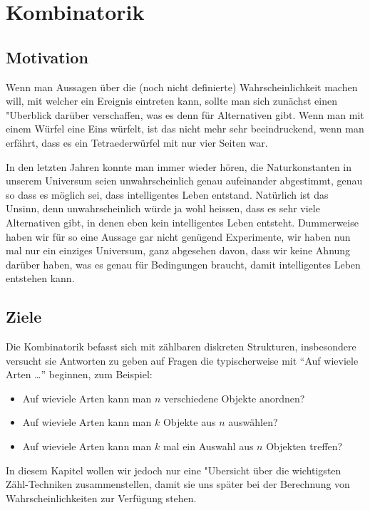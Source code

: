 %
%
%
\chapter{Kombinatorik} \label{chapter-kombinatorik}
\section{Motivation}
Wenn man Aussagen über die (noch nicht definierte) Wahrscheinlichkeit
machen will, mit welcher ein Ereignis eintreten kann, sollte man sich
zunächst einen "Uberblick darüber verschaffen, was es denn für
Alternativen gibt.
Wenn man mit einem Würfel eine Eins würfelt, ist
das nicht mehr sehr beeindruckend, wenn man erfährt, dass es ein
Tetraederwürfel mit nur vier Seiten war. 

In den letzten Jahren konnte man immer wieder hören, die Naturkonstanten
in unserem Universum seien unwahrscheinlich genau aufeinander abgestimmt,
genau so dass es möglich sei, dass intelligentes Leben entstand.
Natürlich ist das Unsinn, denn unwahrscheinlich würde ja wohl
heissen, dass es sehr viele Alternativen gibt, in denen eben kein
intelligentes Leben entsteht.
Dummerweise haben wir für so eine Aussage
gar nicht genügend Experimente, wir haben nun mal nur ein einziges
Universum, ganz abgesehen davon, dass wir keine Ahnung darüber haben,
was es genau für Bedingungen braucht, damit intelligentes Leben
entstehen kann.

\section{Ziele}
Die Kombinatorik befasst sich mit zählbaren diskreten Strukturen,
insbesondere versucht sie Antworten zu geben auf Fragen die
typischerweise mit ``Auf wieviele Arten \dots'' beginnen, zum Beispiel:
\begin{itemize}
\item Auf wieviele Arten kann man $n$ verschiedene Objekte anordnen?
\item Auf wieviele Arten kann man $k$ Objekte aus $n$ auswählen?
\item Auf wieviele Arten kann man $k$ mal ein Auswahl aus $n$ Objekten
treffen?
\end{itemize}

In diesem Kapitel wollen wir jedoch nur eine "Ubersicht über die
wichtigsten Zähl-Techniken zusammenstellen, damit sie uns später
bei der Berechnung von Wahrscheinlichkeiten zur Verfügung stehen.

